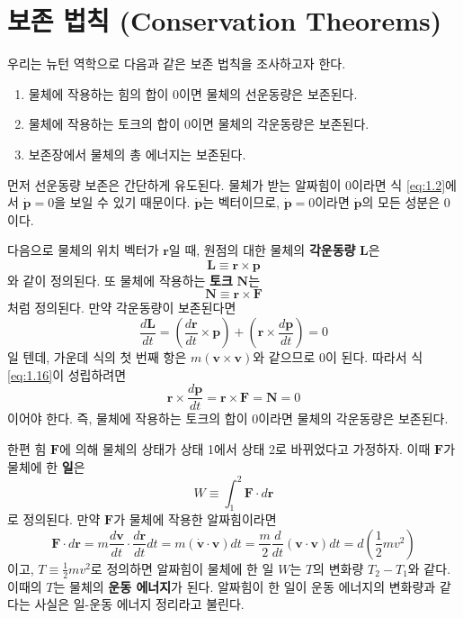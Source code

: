 \documentclass[chapter, oneside, b5paper]{oblivoir}
\theoremstyle{plain}
\theoremstyle{definition}
\theoremstyle{remark}
\begin{document}
\section{보존 법칙 (Conservation Theorems)}
우리는 뉴턴 역학으로 다음과 같은 보존 법칙을 조사하고자 한다.

\begin{enumerate}
    \item 물체에 작용하는 힘의 합이 0이면 물체의 선운동량은 보존된다.
    \item 물체에 작용하는 토크의 합이 0이면 물체의 각운동량은 보존된다.
    \item 보존장에서 물체의 총 에너지는 보존된다.
\end{enumerate}

먼저 선운동량 보존은 간단하게 유도된다. 물체가 받는 알짜힘이 0이라면 식 \ref{eq:1.2}에서 $\mathbf{\dot{p}}=0$을 보일 수 있기 때문이다. $\mathbf{\dot{p}}$는 벡터이므로, $\mathbf{\dot{p}}=0$이라면 $\mathbf{\dot{p}}$의 모든 성분은 0이다.

다음으로 물체의 위치 벡터가 $\textbf{r}$일 때, 원점의 대한 물체의 \textbf{각운동량} \textbf{L}은
\begin{equation}
    \textbf{L} \equiv \textbf{r} \times \textbf{p} \label{eq:1.14} 
\end{equation}
와 같이 정의된다. 또 물체에 작용하는 \textbf{토크} $\mathbf{N}$는
\begin{equation}
    \textbf{N} \equiv \textbf{r} \times \textbf{F} \label{eq:1.15} 
\end{equation}
처럼 정의된다. 만약 각운동량이 보존된다면
\begin{equation}
    \frac{d\textbf{L}}{dt} = (\frac{d\textbf{r}}{dt} \times \textbf{p}) + (\textbf{r} \times \frac{d\textbf{p}}{dt}) = 0 \label{eq:1.16}
\end{equation}
일 텐데, 가운데 식의 첫 번째 항은 $m(\textbf{v} \times \textbf{v})$와 같으므로 0이 된다. 따라서 식 \ref{eq:1.16}이 성립하려면
\begin{equation}
    \textbf{r} \times \frac{d\textbf{p}}{dt} = \textbf{r} \times \textbf{F} = \mathbf{N} = 0 \label{eq:1.17}
\end{equation}
이어야 한다. 즉, 물체에 작용하는 토크의 합이 0이라면 물체의 각운동량은 보존된다.

한편 힘 $\textbf{F}$에 의해 물체의 상태가 상태 1에서 상태 2로 바뀌었다고 가정하자. 이때 $\textbf{F}$가 물체에 한 \textbf{일}은
\begin{equation}
    W \equiv \int_{1}^{2} \textbf{F} \cdot d\textbf{r} \label{eq:1.18}
\end{equation}
로 정의된다. 만약 $\textbf{F}$가 물체에 작용한 알짜힘이라면
\begin{equation}
    \textbf{F} \cdot d\textbf{r} = m\frac{d\textbf{v}}{dt} \cdot  \frac{d\textbf{r}}{dt}dt = m(\dot{\textbf{v}} \cdot \textbf{v})dt = \frac{m}{2}\frac{d}{dt}(\textbf{v} \cdot \textbf{v})dt = d(\frac{1}{2}mv^2) \label{eq:1.19}
\end{equation}
이고, $T \equiv \frac{1}{2}mv^2$로 정의하면 알짜힘이 물체에 한 일 $W$는 $T$의 변화량 $T_2-T_1$와 같다. 이때의 $T$는 물체의 \textbf{운동 에너지}가 된다. 알짜힘이 한 일이 운동 에너지의 변화량과 같다는 사실은 일-운동 에너지 정리라고 불린다.
\end{document}
